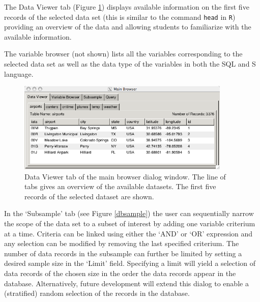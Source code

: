 \documentclass[11pt]{tise_style}
\newcommand{\red}[1]{{\color{red} #1}}
\begin{document}

The Data Viewer tab  (Figure \ref{lineviewer}) displays available information on the first five records of the selected data set (this is similar to the command {\tt head} in {\tt R}) providing an overview of the data and allowing students to familiarize with the available information.  

The variable browser (not shown) lists all the variables corresponding to the selected data set as well as the data type of the variables in both the SQL and S language.  


\begin{figure}[h] %
   \centering
   \includegraphics[width=4in]{db-lineviewer.png} 
   \caption{Data Viewer tab of the main browser dialog window. The line of tabs gives an overview of the available datasets. The first five records of the selected  dataset are shown.}
   \label{lineviewer}
\end{figure}

In the `Subsample' tab (see Figure \ref{dbsample}) the user can sequentially narrow the scope of the data set to a subset of interest by adding one variable criterium at a time. Criteria can be linked using either the `AND' or `OR' expression and any selection can be modified by removing the last specified criterium. The number of data records in the subsample can further be limited by setting a desired sample size  in the  `Limit' field. Specifying a limit will yield a selection of data records of the chosen size in the order the data records appear in the database. Alternatively, future development will extend this dialog to enable a (stratified) random selection of the records in the database.
\end{document}
